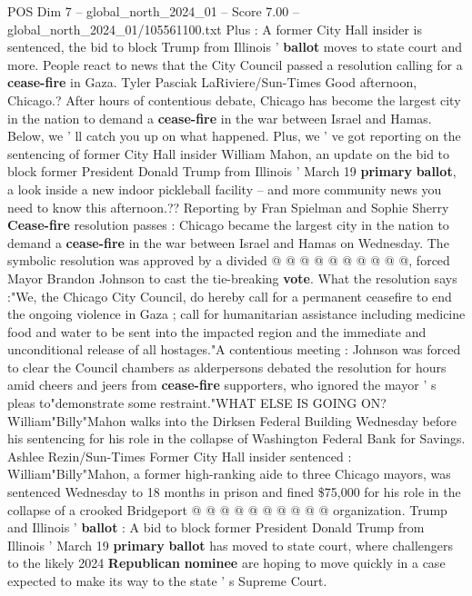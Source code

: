 \begin{textsample}{POS Dim 7 – global\_north\_2024\_01 – Score 7.00 – global\_north\_2024\_01/105561100.txt}  \label{ex:f7_pos_193}
Plus : A former City Hall insider is sentenced, the bid to block Trump from Illinois ' \textbf{ballot} moves to state court and more.
People react to news that the City Council passed a resolution calling for a \textbf{cease-fire} in Gaza.
Tyler Pasciak LaRiviere/Sun-Times Good afternoon, Chicago.?
After hours of contentious debate, Chicago has become the largest city in the nation to demand a \textbf{cease-fire} in the war between Israel and Hamas.
Below, we ' ll catch you up on what happened.
Plus, we ' ve got reporting on the sentencing of former City Hall insider William Mahon, an update on the bid to block former President Donald Trump from Illinois ' March 19 \textbf{primary} \textbf{ballot}, a look inside a new indoor pickleball facility -- and more community news you need to know this afternoon.??
Reporting by Fran Spielman and Sophie Sherry \textbf{Cease-fire} resolution passes : Chicago became the largest city in the nation to demand a \textbf{cease-fire} in the war between Israel and Hamas on Wednesday.
The symbolic resolution was approved by a divided @ @ @ @ @ @ @ @ @ @, forced Mayor Brandon Johnson to cast the tie-breaking \textbf{vote}.
What the resolution says :"We, the Chicago City Council, do hereby call for a permanent ceasefire to end the ongoing violence in Gaza ; call for humanitarian assistance including medicine food and water to be sent into the impacted region and the immediate and unconditional release of all hostages."A contentious meeting : Johnson was forced to clear the Council chambers as alderpersons debated the resolution for hours amid cheers and jeers from \textbf{cease-fire} supporters, who ignored the mayor ' s pleas to"demonstrate some restraint."WHAT ELSE IS GOING ON?
William"Billy"Mahon walks into the Dirksen Federal Building Wednesday before his sentencing for his role in the collapse of Washington Federal Bank for Savings.
Ashlee Rezin/Sun-Times Former City Hall insider sentenced : William"Billy"Mahon, a former high-ranking aide to three Chicago mayors, was sentenced Wednesday to 18 months in prison and fined \$75,000 for his role in the collapse of a crooked Bridgeport @ @ @ @ @ @ @ @ @ @ organization.
Trump and Illinois ' \textbf{ballot} : A bid to block former President Donald Trump from Illinois ' March 19 \textbf{primary} \textbf{ballot} has moved to state court, where challengers to the likely 2024 \textbf{Republican} \textbf{nominee} are hoping to move quickly in a case expected to make its way to the state ' s Supreme Court.

\end{textsample}
